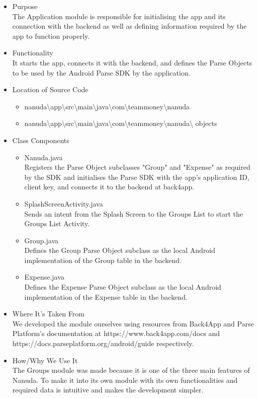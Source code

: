 \documentclass[conference]{IEEEtran}
\begin{document}
\begin{itemize}
    \item Purpose \\ The Application module is responsible for initialising the app and its connection with the backend as well as defining information required by the app to function properly.
    \item Functionality \\ It starts the app, connects it with the backend, and defines the Parse Objects to be used by the Android Parse SDK by the application.
    \item Location of Source Code
        \begin{itemize}
            \item nanuda\textbackslash{}app\textbackslash{}src\textbackslash{}main\textbackslash{}java\textbackslash{}com\textbackslash{}teammoney\textbackslash{}nanuda
            \item nanuda\textbackslash{}app\textbackslash{}src\textbackslash{}main\textbackslash{}java\textbackslash{}com\textbackslash{}teammoney\textbackslash{}nanuda\textbackslash{} objects
        \end{itemize}
    \item Class Components
        \begin{itemize}
            \item Nanuda.java \\ Registers the Parse Object subclasses "Group" and "Expense" as required by the SDK and initialises the Parse SDK with the app's application ID, client key, and connects it to the backend at back4app.
            \item SplashScreenActivity.java \\ Sends an intent from the Splash Screen to the Groups List to start the Groups List Activity.
            \item Group.java \\ Defines the Group Parse Object subclass as the local Android implementation of the Group table in the backend.
            \item Expense.java \\ Defines the Expense Parse Object subclass as the local Android implementation of the Expense table in the backend.
        \end{itemize}
    \item Where It's Taken From \\ We developed the module ourselves using resources from Back4App and Parse Platform's documentation at https://www.back4app.com/docs and https://docs.parseplatform.org/android/guide respectively.
    \item How/Why We Use It \\ The Groups module was made because it is one of the three main features of Nanuda. To make it into its own module with its own functionalities and required data is intuitive and makes the development simpler.
\end{itemize}
\end{document}
